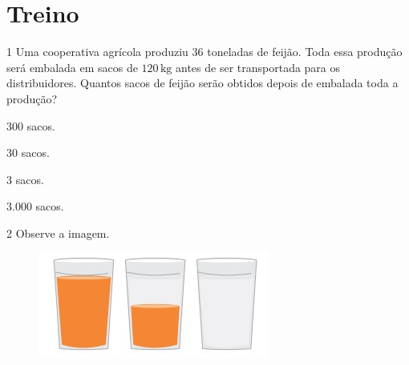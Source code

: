 \begin{mdframed}[linewidth=2pt,linecolor=white,roundcorner=10pt]
\vspace{6cm}
\end{mdframed}

\section*{Treino}

\num{1} Uma cooperativa agrícola produziu $36$ toneladas de feijão. Toda essa
produção será embalada em sacos de $120\,\text{kg}$ antes de ser transportada para
os distribuidores. Quantos sacos de feijão serão obtidos depois de
embalada toda a produção?

\begin{multicols}{2}
\begin{escolha}
\item $300$ sacos.
\item $30$ sacos.
\item $3$ sacos.
\item $3.000$ sacos.
\end{escolha}
\end{multicols}



\num{2}  Observe a imagem.

\begin{figure}[H]
\centering\includegraphics[width=2.98958in,height=1.38542in]{./imgSAEB_6_MAT/media/image100.png}
\end{figure}

